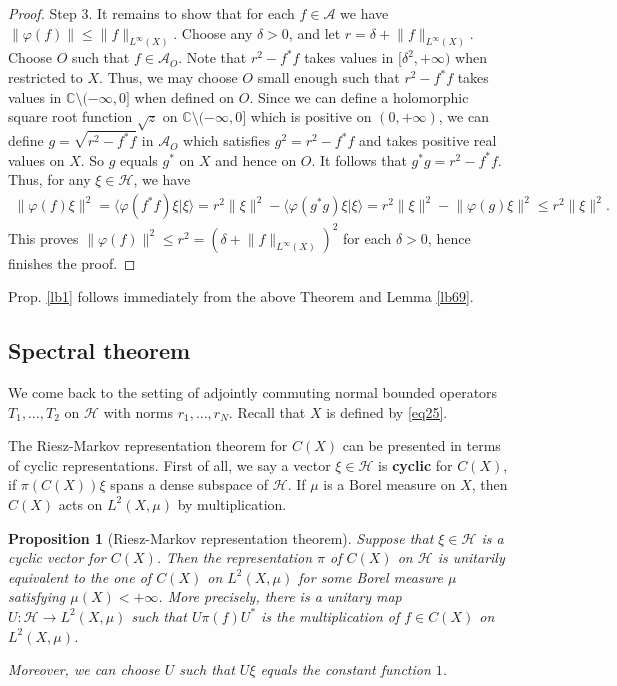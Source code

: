\documentclass[12pt,a4paper,notitlepage]{article}
\theoremstyle{definition}
\theoremstyle{plain}
\newtheorem{pp}[df]{Proposition}
\newcommand{\mc}{\mathcal}
\newcommand{\bk}[1]{\langle {#1}\rangle}
\newcommand{\Cbb}{\mathbb C}
\numberwithin{equation}{section}
\begin{document}
\begin{proof}
Step 3. It remains to show that for each $ f\in\mc A$ we have $\lVert\varphi( f)\lVert\leq \lVert  f\lVert_{L^\infty(X)}$. Choose any $\delta>0$, and let $r=\delta+\lVert  f\lVert_{L^\infty(X)}$. Choose $O$ such that $ f\in\mc A_O$. Note that $r^2- f^* f$ takes values in $[\delta^2,+\infty)$ when restricted to $X$. Thus, we may choose $O$ small enough such that $r^2- f^* f$ takes values in $\Cbb\setminus(-\infty,0]$ when defined on $O$. Since we can define a holomorphic square root function $\sqrt z$ on $\Cbb\setminus(-\infty,0]$ which is positive on $(0,+\infty)$, we can define $ g=\sqrt{r^2- f^* f}$  in $\mc A_O$ which satisfies $ g^2=r^2- f^* f$ and takes positive real values on $X$. So $ g$ equals $ g^*$ on $X$ and hence on $O$. It follows that $ g^* g=r^2- f^* f$. Thus, for any $\xi\in\mc H$, we have
\begin{align*}
\lVert \varphi( f)\xi\lVert^2=\bk{\varphi( f^* f)\xi|\xi}=r^2\lVert\xi\lVert^2-\bk{\varphi( g^* g)\xi|\xi}	=r^2\lVert\xi\lVert^2-\lVert \varphi( g)\xi\lVert^2\leq r^2\lVert\xi\lVert^2.
\end{align*}
This proves $\lVert\varphi( f)\lVert^2\leq r^2=(\delta+\lVert f\lVert_{L^\infty(X)})^2$ for each $\delta>0$, hence finishes the proof.
\end{proof}

Prop.  \ref{lb1} follows immediately from the above Theorem and Lemma \ref{lb69}.


\subsection*{Spectral theorem}

We come back to the setting of adjointly commuting normal bounded operators $T_1,\dots,T_2$ on $\mc H$ with norms $r_1,\dots,r_N$. Recall that $X$ is defined by \eqref{eq25}.

The Riesz-Markov representation theorem for $C(X)$ can be presented in terms of cyclic representations. First of all, we say a vector $\xi\in\mc H$ is \textbf{cyclic} for $C(X)$, if $\pi(C(X))\xi$ spans a dense subspace of $\mc H$. If $\mu$ is a Borel measure on $X$, then $C(X)$ acts on $L^2(X,\mu)$ by multiplication.

\begin{pp}[Riesz-Markov representation theorem]\label{lb7}
Suppose that $\xi\in\mc H$ is a cyclic vector for $C(X)$. Then the representation $\pi$ of $C(X)$ on $\mc H$ is unitarily equivalent to the one of $C(X)$ on $L^2(X,\mu)$ for some Borel measure $\mu$ satisfying $\mu(X)<+\infty$. More precisely, there is a unitary map $U:\mc H\rightarrow L^2(X,\mu)$ such that $U\pi(f)U^*$ is the multiplication of $f\in C(X)$ on $L^2(X,\mu)$.

Moreover, we can choose $U$ such that $U\xi$ equals the constant function $1$.
\end{pp}
\end{document}
